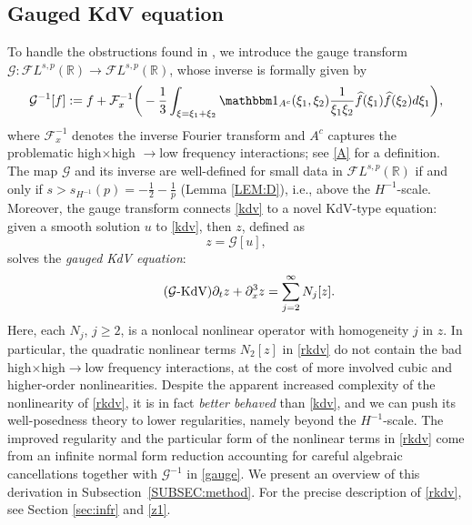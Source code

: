 \documentclass[a4paper,
11pt,  reqno]{amsart}
\newcommand{\5}{\textup{V}}
\newcommand{\FL}{\mathcal{F} L}
\newcommand{\ft}{\widehat}
\newcommand{\ind}{\mathbbm 1}
\theoremstyle{remark}
\newcommand{\R}{\mathbb{R}}
\newcommand{\Ft}{{\mathcal{F}}}
\newcommand{\Gc}{\mathcal{G}}
\numberwithin{equation}{section}
\numberwithin{theorem}{section}
\begin{document}
\subsection{Gauged KdV equation}


To handle the obstructions found in \cite{Grunrock_ldv_hier}, we introduce the gauge transform $\Gc:\FL^{s,p}(\R) \to \FL^{s,p}(\R)$, whose inverse is formally given by
    \begin{equation}
\label{gauge}
\Gc^{-1}[f]
:= f + \Ft_x^{-1}\bigg( - \frac{1}{3} \int_{\xi=\xi_1+\xi_2} \ind_{A^c}(\xi_1,\xi_2) \frac{1}{\xi_1\xi_2} \ft{f}(\xi_1) \ft{f}(\xi_2) d\xi_1 \bigg),
    \end{equation}
    where $\Ft^{-1}_x$ denotes the inverse Fourier transform and
$A^c$ captures the problematic high$\times$high $\to$low frequency interactions; see \eqref{A} for a definition.
The map $\Gc$ and its inverse are well-defined for small data in $\FL^{s,p}(\R)$ if and only if $s>s_{H^{-1}}(p)=-\frac12-\frac1p$ (Lemma \ref{LEM:D}), i.e., above the $H^{-1}$-scale.
    Moreover,
the gauge transform connects \eqref{kdv} to a novel KdV-type equation: given a smooth solution $u$ to \eqref{kdv}, then $z$, defined as
    \begin{equation}\label{defi_z_intro}
z=\mathcal{G}[u],
    \end{equation}
solves the \emph{gauged KdV equation}:
\begin{equation}
\label{rkdv}\tag{$\Gc$-KdV}
\partial_t z+ \partial_x^3 z =
\sum_{j=2}^\infty
N_j[z].
	\end{equation}
Here,
each $N_j$, $j\ge 2$, is a nonlocal nonlinear operator with homogeneity $j$ in $z$. In particular, the quadratic nonlinear terms $N_2[z]$ in \eqref{rkdv} do not contain the bad high$\times$high$\to$low frequency interactions, at the cost of more involved cubic and higher-order nonlinearities.
  Despite the apparent increased complexity of the nonlinearity of \eqref{rkdv}, it is in fact \emph{better behaved} than \eqref{kdv}, and we can push its well-posedness theory to lower regularities, namely beyond the $H^{-1}$-scale.
The improved regularity and the particular form of the nonlinear terms in \eqref{rkdv} come from an infinite normal form reduction
accounting for careful algebraic cancellations together with $\Gc^{-1}$ in \eqref{gauge}.
We present an overview of this derivation in Subsection~\ref{SUBSEC:method}. For the precise description of \eqref{rkdv}, see Section \ref{sec:infr} and \eqref{z1}.
\end{document}

